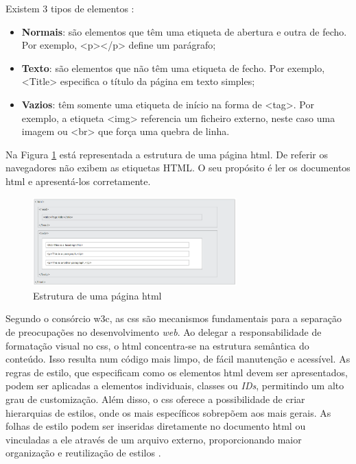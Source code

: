 Existem 3 tipos de elementos \cite{HTMLwikipedia}:
\begin{itemize}
    \item \textbf{Normais}: são elementos que têm uma etiqueta de abertura e outra de fecho. Por exemplo, <p></p> define um parágrafo;
    \item \textbf{Texto}: são elementos que não têm uma etiqueta de fecho. Por exemplo, <Title> especifica o título da página em texto simples;
    \item \textbf{Vazios}: têm somente uma etiqueta de início na forma de <tag>. Por exemplo, a etiqueta <img> referencia um ficheiro externo, neste caso uma imagem ou <br> que força uma quebra de linha.
\end{itemize}

Na Figura \ref{fig:estruturahtml} está representada a estrutura de uma página \acrshort{html}. De referir os navegadores não exibem as etiquetas HTML. O seu propósito é ler os documentos \acrshort{html} e apresentá-los corretamente.

\begin{figure}[hbtp]
    \centering
    \includegraphics[width=0.7\textwidth]{figures/html_page_structure.png}
    \caption{Estrutura de uma página \acrshort{html} \cite{HTMLbasics}}
    \label{fig:estruturahtml}
\end{figure}

Segundo o consórcio \acrshort{w3c}, as \acrshort{css} são mecanismos fundamentais para a separação de preocupações no desenvolvimento \textit{web}. Ao delegar a responsabilidade de formatação visual no \acrshort{css}, o \acrshort{html} concentra-se na estrutura semântica do conteúdo. Isso resulta num código mais limpo, de fácil manutenção e acessível. As regras de estilo, que especificam como os elementos \acrshort{html} devem ser apresentados, podem ser aplicadas a elementos individuais, classes ou \textit{IDs}, permitindo um alto grau de customização. Além disso, o \acrshort{css} oferece a possibilidade de criar hierarquias de estilos, onde os mais específicos sobrepõem aos mais gerais. As folhas de estilo podem ser inseridas diretamente no documento \acrshort{html} ou vinculadas a ele através de um arquivo externo, proporcionando maior organização e reutilização de estilos \cite{w3ccss}.

